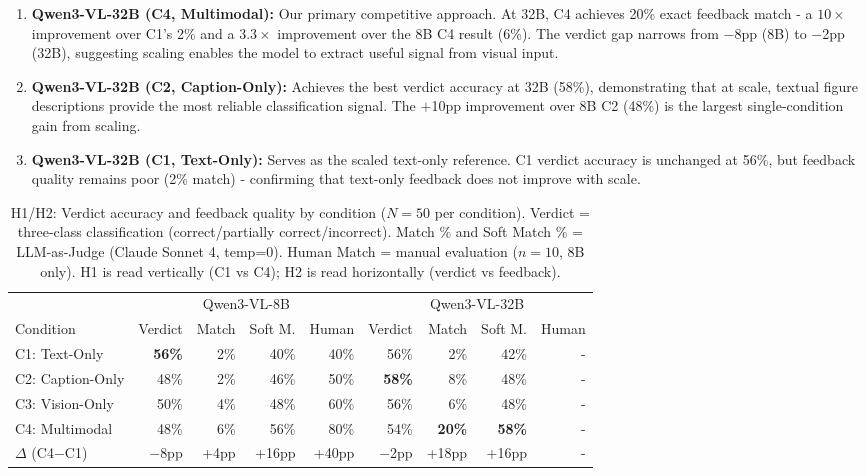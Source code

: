 \documentclass{article} %
\begin{document}
\begin{enumerate}[itemsep=6pt]
    \item \textbf{Qwen3-VL-32B (C4, Multimodal):} Our primary competitive approach. At 32B, C4 achieves 20\% exact feedback match - a $10{\times}$ improvement over C1's 2\% and a $3.3{\times}$ improvement over the 8B C4 result (6\%). The verdict gap narrows from $-$8pp (8B) to $-$2pp (32B), suggesting scaling enables the model to extract useful signal from visual input.

    \item \textbf{Qwen3-VL-32B (C2, Caption-Only):} Achieves the best verdict accuracy at 32B (58\%), demonstrating that at scale, textual figure descriptions provide the most reliable classification signal. The $+$10pp improvement over 8B C2 (48\%) is the largest single-condition gain from scaling.

    \item \textbf{Qwen3-VL-32B (C1, Text-Only):} Serves as the scaled text-only reference. C1 verdict accuracy is unchanged at 56\%, but feedback quality remains poor (2\% match) - confirming that text-only feedback does not improve with scale.
\end{enumerate}

\begin{table}[H]
\centering
\small
\caption{H1/H2: Verdict accuracy and feedback quality by condition ($N{=}50$ per condition). Verdict = three-class classification (correct/partially correct/incorrect). Match \% and Soft Match \% = LLM-as-Judge (Claude Sonnet 4, temp=0). Human Match = manual evaluation ($n{=}10$, 8B only). H1 is read vertically (C1 vs C4); H2 is read horizontally (verdict vs feedback).}
\label{tab:h1h2}
\begin{tabular}{@{}lrrrrrrrr@{}}
\toprule
 & \multicolumn{4}{c}{Qwen3-VL-8B} & \multicolumn{4}{c}{Qwen3-VL-32B} \\
\cmidrule(lr){2-5} \cmidrule(l){6-9}
Condition & Verdict & Match & Soft M. & Human & Verdict & Match & Soft M. & Human \\
\midrule
C1: Text-Only     & \textbf{56\%} & 2\%  & 40\% & 40\% & 56\%          & 2\%           & 42\% & - \\
C2: Caption-Only  & 48\%          & 2\%  & 46\% & 50\% & \textbf{58\%} & 8\%           & 48\% & - \\
C3: Vision-Only   & 50\%          & 4\%  & 48\% & 60\% & 56\%          & 6\%           & 48\% & - \\
C4: Multimodal    & 48\%          & 6\%  & 56\% & 80\% & 54\%          & \textbf{20\%} & \textbf{58\%} & - \\
\midrule
$\Delta$ (C4$-$C1) & $-$8pp & +4pp & +16pp & +40pp & $-$2pp & +18pp & +16pp & - \\
\bottomrule
\end{tabular}
\end{table}
\end{document}
